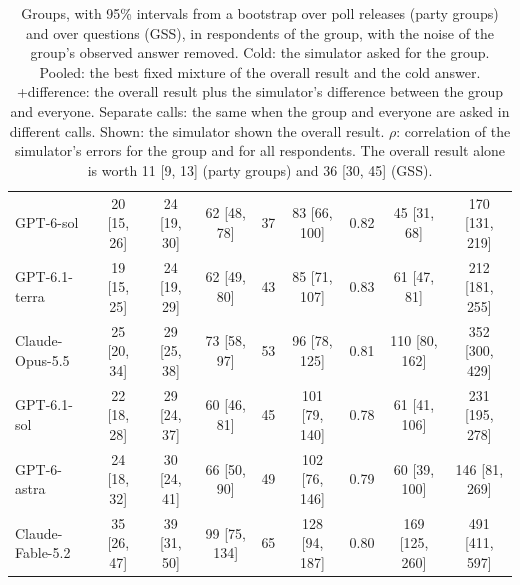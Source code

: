 \begin{table}[h]
\begin{tabular}{lcccccccc}
GPT-6-sol & 20 {\scriptsize[15, 26]} & 24 {\scriptsize[19, 30]} & 62 {\scriptsize[48, 78]} & 37 & 83 {\scriptsize[66, 100]} & 0.82 & 45 {\scriptsize[31, 68]} & 170 {\scriptsize[131, 219]} \\
GPT-6.1-terra & 19 {\scriptsize[15, 25]} & 24 {\scriptsize[19, 29]} & 62 {\scriptsize[49, 80]} & 43 & 85 {\scriptsize[71, 107]} & 0.83 & 61 {\scriptsize[47, 81]} & 212 {\scriptsize[181, 255]} \\
Claude-Opus-5.5 & 25 {\scriptsize[20, 34]} & 29 {\scriptsize[25, 38]} & 73 {\scriptsize[58, 97]} & 53 & 96 {\scriptsize[78, 125]} & 0.81 & 110 {\scriptsize[80, 162]} & 352 {\scriptsize[300, 429]} \\
GPT-6.1-sol & 22 {\scriptsize[18, 28]} & 29 {\scriptsize[24, 37]} & 60 {\scriptsize[46, 81]} & 45 & 101 {\scriptsize[79, 140]} & 0.78 & 61 {\scriptsize[41, 106]} & 231 {\scriptsize[195, 278]} \\
GPT-6-astra & 24 {\scriptsize[18, 32]} & 30 {\scriptsize[24, 41]} & 66 {\scriptsize[50, 90]} & 49 & 102 {\scriptsize[76, 146]} & 0.79 & 60 {\scriptsize[39, 100]} & 146 {\scriptsize[81, 269]} \\
Claude-Fable-5.2 & 35 {\scriptsize[26, 47]} & 39 {\scriptsize[31, 50]} & 99 {\scriptsize[75, 134]} & 65 & 128 {\scriptsize[94, 187]} & 0.80 & 169 {\scriptsize[125, 260]} & 491 {\scriptsize[411, 597]} \\
\bottomrule
\end{tabular}
\caption{Groups, with 95\% intervals from a bootstrap over poll releases (party groups) and over questions (GSS), in respondents of the group, with the noise of the group's observed answer removed. Cold: the simulator asked for the group. Pooled: the best fixed mixture of the overall result and the cold answer. +difference: the overall result plus the simulator's difference between the group and everyone. Separate calls: the same when the group and everyone are asked in different calls. Shown: the simulator shown the overall result. $\rho$: correlation of the simulator's errors for the group and for all respondents. The overall result alone is worth 11 [9, 13] (party groups) and 36 [30, 45] (GSS).}
\label{tab:groups}
\end{table}

